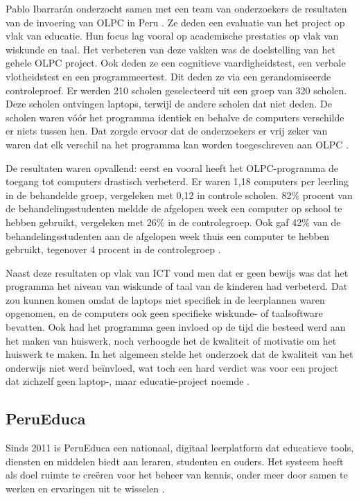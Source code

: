 Pablo Ibarrarán onderzocht samen met een team van onderzoekers de resultaten van de invoering van OLPC in Peru \autocite{Ibarraran2012}. Ze deden een evaluatie van het project op vlak van educatie. Hun focus lag vooral op academische prestaties op vlak van wiskunde en taal. Het verbeteren van deze vakken was de doelstelling van het gehele OLPC project. Ook deden ze een cognitieve vaardigheidstest, een verbale vlotheidstest en een programmeertest. Dit deden ze via een gerandomiseerde controleproef. Er werden 210 scholen geselecteerd uit een groep van 320 scholen. Deze scholen ontvingen laptops, terwijl de andere scholen dat niet deden. De scholen waren vóór het programma identiek en behalve de computers verschilde er niets tussen hen. Dat zorgde ervoor dat de onderzoekers er vrij zeker van waren dat elk verschil na het programma kan worden toegeschreven aan OLPC \autocite{Ibarraran2012}.

De resultaten waren opvallend: eerst en vooral heeft het OLPC-programma de toegang tot computers drastisch verbeterd. Er waren 1,18 computers per leerling in de behandelde groep, vergeleken met 0,12 in controle scholen. 82\% procent van de behandelingsstudenten meldde de afgelopen week een computer op school te hebben gebruikt, vergeleken met 26\% in de controlegroep. Ook gaf 42\% van de behandelingsstudenten aan de afgelopen week thuis een computer te hebben gebruikt, tegenover 4 procent in de controlegroep \autocite{Ibarraran2012}.

Naast deze resultaten op vlak van ICT vond men dat er geen bewijs was dat het programma het niveau van wiskunde of taal van de kinderen had verbeterd. Dat zou kunnen komen omdat de laptops niet specifiek in de leerplannen waren opgenomen, en de computers ook geen specifieke wiskunde- of taalsoftware bevatten. Ook had het programma geen invloed op de tijd die besteed werd aan het maken van huiswerk, noch verhoogde het de kwaliteit of motivatie om het huiswerk te maken. In het algemeen stelde het onderzoek dat de kwaliteit van het onderwijs niet werd beïnvloed, wat toch een hard verdict was voor een project dat zichzelf geen laptop-, maar educatie-project noemde \autocite{Ibarraran2012}.

\subsection{PeruEduca}
Sinds 2011 is PeruEduca een nationaal, digitaal leerplatform dat educatieve tools, diensten en middelen biedt aan leraren, studenten en ouders. Het systeem heeft als doel ruimte te creëren voor het beheer van kennis, onder meer door samen te werken en ervaringen uit te wisselen \autocite{EducationPeru2020}.

